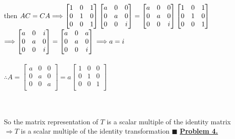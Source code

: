 \documentclass[12pt]{article}
\renewcommand{\qed}{\hfill$\blacksquare$}
\begin{document}
\hfill\begin{minipage}{\dimexpr\textwidth-10mm}
	then $AC=CA
		\\\\
		\Longrightarrow\begin{bmatrix}
			1 & 0 & 1 \\
			0 & 1 & 0 \\
			0 & 0 & 1 \\
		\end{bmatrix}\begin{bmatrix}
			a & 0 & 0 \\
			0 & a & 0 \\
			0 & 0 & i \\
		\end{bmatrix} = \begin{bmatrix}
			a & 0 & 0 \\
			0 & a & 0 \\
			0 & 0 & i \\
		\end{bmatrix}\begin{bmatrix}
			1 & 0 & 1 \\
			0 & 1 & 0 \\
			0 & 0 & 1 \\
		\end{bmatrix}$\\
	$\Longrightarrow\begin{bmatrix}
			a & 0 & i \\
			0 & a & 0 \\
			0 & 0 & i \\
		\end{bmatrix} = \begin{bmatrix}
			a & 0 & a \\
			0 & a & 0 \\
			0 & 0 & i \\
		\end{bmatrix}
		\\\\
		\Longrightarrow a = i$
	\\\\
	$\therefore A = \begin{bmatrix}
			a & 0 & 0 \\
			0 & a & 0 \\
			0 & 0 & a \\
		\end{bmatrix} = a\begin{bmatrix}
			1 & 0 & 0 \\
			0 & 1 & 0 \\
			0 & 0 & 1 \\
		\end{bmatrix}$\\
\end{minipage}
\\\\
So the matrix representation of $T$ is a scalar multiple of the identity matrix\\
$\Longrightarrow T$ is a scalar multiple of the identity transformation \qed
\newpage
{\LARGE \noindent \underline{\textbf{Problem 4.}}}\\
\end{document}
